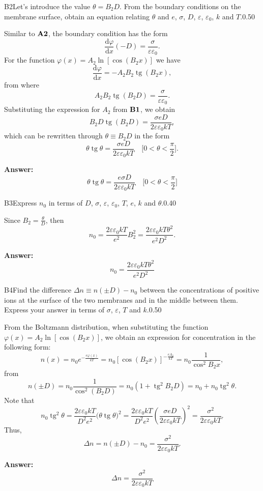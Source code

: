 \documentclass[11pt,a4paper]{article}
\begin{document}
\begin{solcard}{B2}{Let's introduce the value $\theta=B_2D$. From the boundary conditions on the membrane surface, obtain an equation relating $\theta$ and $e$, $\sigma$, $D$, $\varepsilon$, $\varepsilon_0$, $k$ and $T$.}{0.50}

Similar to $\bf A2$, the boundary condition has the form\[\frac{\mathrm d\varphi}{\mathrm dx}(-D)=\frac{\sigma}{\varepsilon\varepsilon_0}.\]For the function $\varphi(x)=A_2\ln[\cos(B_2x)]$ we have\[\frac{\mathrm d\varphi}{\mathrm dx}=-A_2B_2\operatorname{tg}(B_2x),\]from where\[A_2B_2\operatorname{tg}(B_2D)=\frac{\sigma}{\varepsilon\varepsilon_0}.\]Substituting the expression for $A_2$ from $\bf B1$, we obtain\[B_2D\operatorname{tg}(B_2D)=\frac{\sigma eD}{2\varepsilon\varepsilon_0kT},\]which can be rewritten through $\theta\equiv B_2D$ in the form\[\theta\operatorname{tg}\theta=\frac{\sigma eD}{2\varepsilon\varepsilon_0kT}\quad\Big[0 < \theta < \frac\pi2\Big].\]

\par\smallskip\noindent\textbf{Answer:} \[\theta\operatorname{tg}\theta=\frac{e\sigma D}{2\varepsilon\varepsilon_0kT}\quad\Big[0 < \theta < \frac\pi2\Big]\]
\end{solcard}

\begin{solcard}{B3}{Express $n_0$ in terms of $D$, $\sigma$, $\varepsilon$, $\varepsilon_0$, $T$, $e$, $k$ and $\theta$.}{0.40}

Since $B_2=\frac\theta D$, then \[n_0=\frac{2\varepsilon\varepsilon_0kT}{e^2}B_2^2=\frac{2\varepsilon\varepsilon_0kT\theta^2}{e^2D^2}.\]

\par\smallskip\noindent\textbf{Answer:} \[n_0=\frac{2\varepsilon\varepsilon_0kT\theta^2}{e^2D^2}\]
\end{solcard}

\begin{solcard}{B4}{Find the difference $\Delta n\equiv n(\pm D)-n_0$ between the concentrations of positive ions at the surface of the two membranes and in the middle between them. Express your answer in terms of $\sigma$, $\varepsilon$, $T$ and $k$.}{0.50}

From the Boltzmann distribution, when substituting the function $\varphi(x)=A_2\ln[\cos(B_2x)]$, we obtain an expression for concentration in the following form:\[n(x)=n_0e^{-\frac{e\varphi(x)}{kT}}=n_0[\cos(B_2x)]^{-\frac{eA_2}{kT}}=n_0\frac1{\cos^2B_2x},\]from\[n(\pm D)=n_0\frac1{\cos^2(B_2D)}=n_0\left(1+\operatorname{tg}^2B_2D\right)=n_0+n_0\operatorname{tg}^2\theta.\]Note that\[n_0\operatorname{tg}^2\theta=\frac{2\varepsilon\varepsilon_0kT}{D^2e^2}\Big(\theta\operatorname{tg}\theta\Big)^2=\frac{2\varepsilon\varepsilon_0kT}{D^2e^2}\left(\frac{\sigma eD}{2\varepsilon\varepsilon_0kT}\right)^2=\frac{\sigma^2}{2\varepsilon\varepsilon_0kT}.\]Thus,\[\Delta n=n(\pm D)-n_0=\frac{\sigma^2}{2\varepsilon\varepsilon_0kT}.\]

\par\smallskip\noindent\textbf{Answer:} \[\Delta n=\frac{\sigma^2}{2\varepsilon\varepsilon_0kT}\]
\end{solcard}
\end{document}
